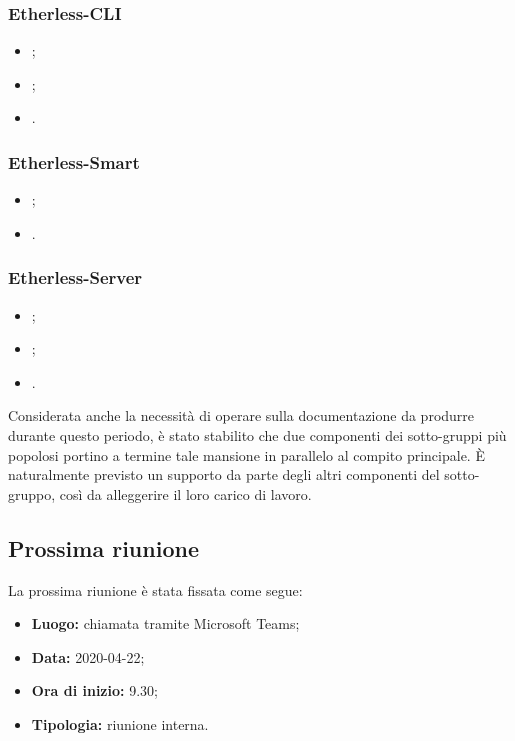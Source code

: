 	\subsubsection*{Etherless-CLI}
	\begin{itemize}
		\item \EG{};
		\item \FJ{};
		\item \MP{}.
	\end{itemize}
	\subsubsection*{Etherless-Smart}
	\begin{itemize}
		\item \NF{};
		\item \VB{}.
	\end{itemize}
	\subsubsection*{Etherless-Server}
	\begin{itemize}
		\item \AS{};
		\item \AZ{};
		\item \LB{}.
	\end{itemize}
	\pagebreak %
	
	\noindent Considerata anche la necessità di operare sulla documentazione da produrre durante questo periodo, è stato stabilito che due componenti dei sotto-gruppi più popolosi portino a termine tale mansione in parallelo al compito principale. È naturalmente previsto un supporto da parte degli altri componenti del sotto-gruppo, così da alleggerire il loro carico di lavoro.
	\subsection{Prossima riunione}
		La prossima riunione è stata fissata come segue:
		\begin{itemize}
			\item \textbf{Luogo: } chiamata tramite Microsoft Teams;
			\item \textbf{Data: } 2020-04-22;
			\item \textbf{Ora di inizio: } 9.30;
			\item \textbf{Tipologia: } riunione interna.
		\end{itemize}
